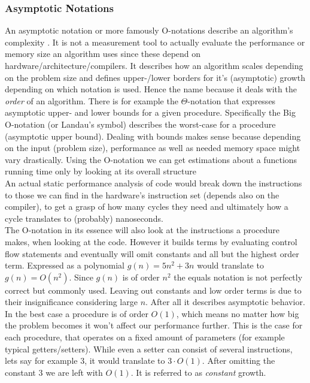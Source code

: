 \subsubsection{Asymptotic Notations}\label{asymptotic_notations}
An asymptotic notation or more famously O-notations describe an algorithm's complexity . It is not a measurement tool to actually evaluate the performance or memory size an algorithm uses since these depend on hardware/architecture/compilers. It describes how an algorithm scales depending on the problem size and defines upper-/lower borders for it's (asymptotic) growth depending on which notation is used. Hence the name because it deals with the \textit{order} of an algorithm.
There is for example the $\Theta$-notation that expresses asymptotic upper- and lower bounds for a given procedure.
Specifically the Big O-notation (or Landau's symbol) describes the worst-case for a procedure (asymptotic upper bound). Dealing with bounds makes sense because depending on the input (problem size), performance as well as needed memory space might vary drastically. Using the O-notation we can get estimations about a functions running time only by looking at its overall structure \\
An actual static performance analysis of code would break down the instructions to those we can find in the hardware's instruction set (depends also on the compiler), to get a grasp of how many cycles they need and ultimately how a cycle translates to (probably) nanoseconds.\\
The O-notation in its essence will also look at the instructions a procedure makes, when looking at the code. However it builds terms by evaluating control flow statements and eventually will omit constants and all but the highest order term. Expressed as a polynomial $g(n) = 5n^2+3n$ would translate to $g(n) = O(n^2)$. Since $g(n)$ is of order $n^2$ the equals notation is not perfectly correct but commonly used. Leaving out constants and low order terms is due to their insignificance considering large $n$. After all it describes asymptotic behavior.\\
In the best case a procedure is of order $O(1)$, which means no matter how big the problem becomes it won't affect our performance further. This is the case for each procedure, that operates on a fixed amount of parameters (for example typical getters/setters). While even a setter can consist of several instructions, lets say for example 3, it would translate to $3\cdot O(1)$. After omitting the constant $3$ we are left with $O(1)$. It is referred to as \textit{constant} growth.\\
